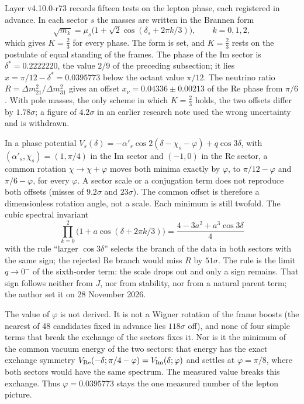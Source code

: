 Layer v4.10.0-r73 records fifteen tests on the lepton phase, each
registered in advance. In each sector $s$ the masses are written in the
Brannen form
\begin{equation}
 \sqrt{m_k}=\mu_s\bigl(1+\sqrt2\cos(\delta_s+2\pi k/3)\bigr),\qquad k=0,1,2,
\end{equation}
which gives $K=\tfrac23$ for every phase. The form is set, and
$K=\tfrac23$ rests on the postulate of equal standing of the frames. The
phase of the Im sector is $\delta^*=0.2222220$, the value $2/9$ of the
preceding subsection; it lies $x=\pi/12-\delta^*=0.0395773$ below the
octant value $\pi/12$. The neutrino ratio
$R=\Delta m^2_{21}/\Delta m^2_{31}$ gives an offset
$x_\nu=0.04336\pm0.00213$ of the Re phase from $\pi/6$. With pole
masses, the only scheme in which $K=\tfrac23$ holds, the two offsets
differ by $1.78\sigma$; a figure of $4.2\sigma$ in an earlier research
note used the wrong uncertainty and is withdrawn.

In a phase potential
$V_s(\delta)=-\alpha'_s\cos2(\delta-\chi_s-\varphi)+q\cos3\delta$, with
$(\alpha'_s,\chi_s)=(1,\pi/4)$ in the Im sector and $(-1,0)$ in the Re
sector, a common rotation $\chi\to\chi+\varphi$ moves both minima exactly
by $\varphi$, to $\pi/12-\varphi$ and $\pi/6-\varphi$, for every
$\varphi$. A sector scale or a conjugation term does not reproduce both
offsets (misses of $9.2\sigma$ and $23\sigma$). The common offset is
therefore a dimensionless rotation angle, not a scale. Each minimum is
still twofold. The cubic spectral invariant
\begin{equation}
 \prod_{k=0}^{2}\bigl(1+a\cos(\delta+2\pi k/3)\bigr)=\frac{4-3a^2+a^3\cos3\delta}{4}
\end{equation}
with the rule ``larger $\cos3\delta$'' selects the branch of the data in
both sectors with the same sign; the rejected Re branch would miss $R$
by $51\sigma$. The rule is the limit $q\to0^-$ of the sixth-order term:
the scale drops out and only a sign remains. That sign follows neither
from $J$, nor from stability, nor from a natural parent term; the author
set it on 28 November 2026.

The value of $\varphi$ is not derived. It is not a Wigner rotation of
the frame boosts (the nearest of 48 candidates fixed in advance lies
$118\sigma$ off), and none of four simple terms that break the exchange
of the sectors fixes it. Nor is it the minimum of the common vacuum
energy of the two sectors: that energy has the exact exchange symmetry
$V_{\rm Re}(-\delta;\pi/4-\varphi)=V_{\rm Im}(\delta;\varphi)$ and settles
at $\varphi=\pi/8$, where both sectors would have the same spectrum. The
measured value breaks this exchange. Thus $\varphi=0.0395773$ stays the
one measured number of the lepton picture.

